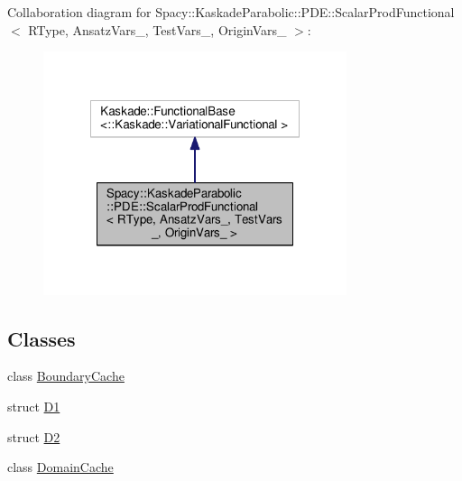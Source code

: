 Collaboration diagram for Spacy\-:\-:Kaskade\-Parabolic\-:\-:P\-D\-E\-:\-:Scalar\-Prod\-Functional$<$ R\-Type, Ansatz\-Vars\-\_\-, Test\-Vars\-\_\-, Origin\-Vars\-\_\- $>$\-:
\nopagebreak
\begin{figure}[H]
\begin{center}
\leavevmode
\includegraphics[width=252pt]{classSpacy_1_1KaskadeParabolic_1_1PDE_1_1ScalarProdFunctional__coll__graph}
\end{center}
\end{figure}
\subsection*{Classes}
\begin{DoxyCompactItemize}
\item 
class \hyperlink{classSpacy_1_1KaskadeParabolic_1_1PDE_1_1ScalarProdFunctional_1_1BoundaryCache}{Boundary\-Cache}
\item 
struct \hyperlink{structSpacy_1_1KaskadeParabolic_1_1PDE_1_1ScalarProdFunctional_1_1D1}{D1}
\item 
struct \hyperlink{structSpacy_1_1KaskadeParabolic_1_1PDE_1_1ScalarProdFunctional_1_1D2}{D2}
\item 
class \hyperlink{classSpacy_1_1KaskadeParabolic_1_1PDE_1_1ScalarProdFunctional_1_1DomainCache}{Domain\-Cache}
\end{DoxyCompactItemize}
